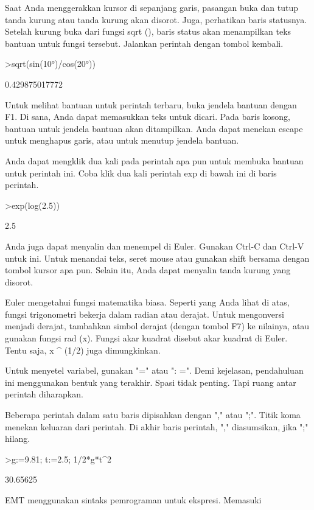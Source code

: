 \documentclass{article}
\begin{document}
\begin{eulernotebook}
\begin{eulercomment}
\begin{eulercomment}
\begin{eulercomment}
Saat Anda menggerakkan kursor di sepanjang garis, pasangan buka dan
tutup tanda kurung atau tanda kurung akan disorot. Juga, perhatikan
baris statusnya. Setelah kurung buka dari fungsi sqrt (), baris status
akan menampilkan teks bantuan untuk fungsi tersebut. Jalankan perintah
dengan tombol kembali.
\end{eulercomment}
\begin{eulerprompt}
>sqrt(sin(10°)/cos(20°))
\end{eulerprompt}
\begin{euleroutput}
  0.429875017772
\end{euleroutput}
\begin{eulercomment}
Untuk melihat bantuan untuk perintah terbaru, buka jendela bantuan
dengan F1. Di sana, Anda dapat memasukkan teks untuk dicari. Pada
baris kosong, bantuan untuk jendela bantuan akan ditampilkan. Anda
dapat menekan escape untuk menghapus garis, atau untuk menutup jendela
bantuan.

Anda dapat mengklik dua kali pada perintah apa pun untuk membuka
bantuan untuk perintah ini. Coba klik dua kali perintah exp di bawah
ini di baris perintah.
\end{eulercomment}
\begin{eulerprompt}
>exp(log(2.5))
\end{eulerprompt}
\begin{euleroutput}
  2.5
\end{euleroutput}
\begin{eulercomment}
Anda juga dapat menyalin dan menempel di Euler. Gunakan Ctrl-C dan
Ctrl-V untuk ini. Untuk menandai teks, seret mouse atau gunakan shift
bersama dengan tombol kursor apa pun. Selain itu, Anda dapat menyalin
tanda kurung yang disorot.
\end{eulercomment}
\begin{eulercomment}
Euler mengetahui fungsi matematika biasa. Seperti yang Anda lihat di
atas, fungsi trigonometri bekerja dalam radian atau derajat. Untuk
mengonversi menjadi derajat, tambahkan simbol derajat (dengan tombol
F7) ke nilainya, atau gunakan fungsi rad (x). Fungsi akar kuadrat
disebut akar kuadrat di Euler. Tentu saja, x \textasciicircum{} (1/2) juga
dimungkinkan.

Untuk menyetel variabel, gunakan "=" atau ": =". Demi kejelasan,
pendahuluan ini menggunakan bentuk yang terakhir. Spasi tidak penting.
Tapi ruang antar perintah diharapkan.

Beberapa perintah dalam satu baris dipisahkan dengan "," atau ";".
Titik koma menekan keluaran dari perintah. Di akhir baris perintah,
"," diasumsikan, jika ";" hilang.
\end{eulercomment}
\begin{eulerprompt}
>g:=9.81; t:=2.5; 1/2*g*t^2
\end{eulerprompt}
\begin{euleroutput}
  30.65625
\end{euleroutput}
\begin{eulercomment}
EMT menggunakan sintaks pemrograman untuk ekspresi. Memasuki


\end{eulercomment}
\end{eulercomment}
\end{eulercomment}
\end{eulernotebook}
\end{document}
